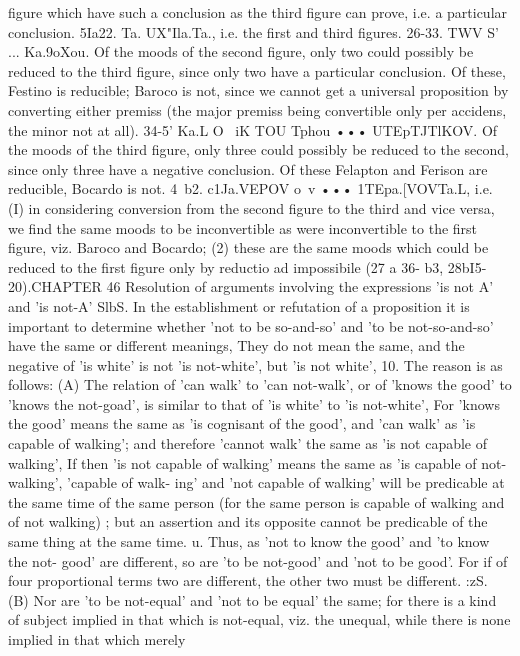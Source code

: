 {{{{{{{{{{{{{{{{{{{{{{{{{{{{{{{{{{{{{{figure which have such a conclusion as the third figure can prove,
i.e. a particular conclusion.
5Ia22. Ta. UX"Ila.Ta., i.e. the first and third figures.
26-33. TWV S' ... Ka.9oXou. Of the moods of the second figure,
only two could possibly be reduced to the third figure, since only
two have a particular conclusion. Of these, Festino is reducible;
Baroco is not, since we cannot get a universal proposition by
converting either premiss (the major premiss being convertible
only per accidens, the minor not at all).
34-5' Ka.L O~ iK TOU Tphou ••• UTEpTJTlKOV. Of the moods of
the third figure, only three could possibly be reduced to the
second, since only three have a negative conclusion. Of these
Felapton and Ferison are reducible, Bocardo is not.
4~b2. c1Ja.VEPOV o~v ••• 1TEpa.[VOVTa.L, i.e. (I) in considering
conversion from the second figure to the third and vice versa, we
find the same moods to be inconvertible as were inconvertible
to the first figure, viz. Baroco and Bocardo; (2) these are the same
moods which could be reduced to the first figure only by reductio
ad impossibile (27 a 36- b3, 28bI5-20).CHAPTER 46
Resolution of arguments involving the expressions 'is not A' and
'is not-A'
SlbS. In the establishment or refutation of a proposition it is
important to determine whether 'not to be so-and-so' and 'to be
not-so-and-so' have the same or different meanings, They do not
mean the same, and the negative of 'is white' is not 'is not-white',
but 'is not white',
10. The reason is as follows: (A) The relation of 'can walk' to
'can not-walk', or of 'knows the good' to 'knows the not-goad',
is similar to that of 'is white' to 'is not-white', For 'knows the
good' means the same as 'is cognisant of the good', and 'can walk'
as 'is capable of walking'; and therefore 'cannot walk' the same
as 'is not capable of walking', If then 'is not capable of walking'
means the same as 'is capable of not-walking', 'capable of walk-
ing' and 'not capable of walking' will be predicable at the same
time of the same person (for the same person is capable of walking
and of not walking) ; but an assertion and its opposite cannot be
predicable of the same thing at the same time.
u. Thus, as 'not to know the good' and 'to know the not-
good' are different, so are 'to be not-good' and 'not to be good'.
For if of four proportional terms two are different, the other two
must be different.
:zS. (B) Nor are 'to be not-equal' and 'not to be equal' the same;
for there is a kind of subject implied in that which is not-equal,
viz. the unequal, while there is none implied in that which merely
}}}}}}}}}}}}}}}}}}}}}}}}}}}}}}}}}}}}}}
